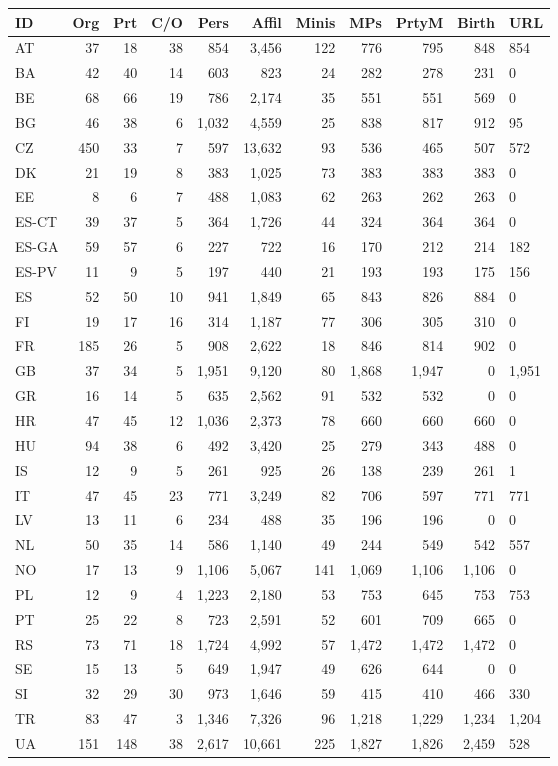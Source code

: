 \begin{tabular}{l|rrr|rrrrrr}
ID&Org&Prt&C/O&Pers&Affil&Minis&MPs&PrtyM&Birth&URL\\
\hline
AT&37&18&38&854&3,456&122&776&795&848&854\\
BA&42&40&14&603&823&24&282&278&231&0\\
BE&68&66&19&786&2,174&35&551&551&569&0\\
BG&46&38&6&1,032&4,559&25&838&817&912&95\\
CZ&450&33&7&597&13,632&93&536&465&507&572\\
DK&21&19&8&383&1,025&73&383&383&383&0\\
EE&8&6&7&488&1,083&62&263&262&263&0\\
ES-CT&39&37&5&364&1,726&44&324&364&364&0\\
ES-GA&59&57&6&227&722&16&170&212&214&182\\
ES-PV&11&9&5&197&440&21&193&193&175&156\\
ES&52&50&10&941&1,849&65&843&826&884&0\\
FI&19&17&16&314&1,187&77&306&305&310&0\\
FR&185&26&5&908&2,622&18&846&814&902&0\\
GB&37&34&5&1,951&9,120&80&1,868&1,947&0&1,951\\
GR&16&14&5&635&2,562&91&532&532&0&0\\
HR&47&45&12&1,036&2,373&78&660&660&660&0\\
HU&94&38&6&492&3,420&25&279&343&488&0\\
IS&12&9&5&261&925&26&138&239&261&1\\
IT&47&45&23&771&3,249&82&706&597&771&771\\
LV&13&11&6&234&488&35&196&196&0&0\\
NL&50&35&14&586&1,140&49&244&549&542&557\\
NO&17&13&9&1,106&5,067&141&1,069&1,106&1,106&0\\
PL&12&9&4&1,223&2,180&53&753&645&753&753\\
PT&25&22&8&723&2,591&52&601&709&665&0\\
RS&73&71&18&1,724&4,992&57&1,472&1,472&1,472&0\\
SE&15&13&5&649&1,947&49&626&644&0&0\\
SI&32&29&30&973&1,646&59&415&410&466&330\\
TR&83&47&3&1,346&7,326&96&1,218&1,229&1,234&1,204\\
UA&151&148&38&2,617&10,661&225&1,827&1,826&2,459&528\\
\end{tabular}

